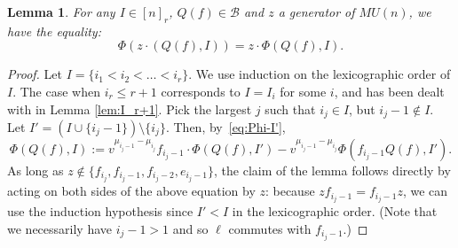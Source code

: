 \documentclass{amsart}
\numberwithin{equation}{section}
\theoremstyle{theorem}
\newtheorem{lemma}[theorem]{Lemma}
\theoremstyle{definition}
\newcommand{\sm}{\setminus}
\newcommand{\bb}{\mathcal{B}}
\newcommand{\drcomm}[1]{\textcolor{red}{#1}}
\begin{document}
\begin{lemma} \label{lem:general}
For any $I\in [n]_r$, $Q(f)\in \bb$ and $z$ a generator of $MU(n)$, we have the equality:
\[\Phi(z\cdot (Q(f),I)) = z\cdot \Phi(Q(f), I).\]
\end{lemma}

\begin{proof}
Let $I=\{i_1<i_2<\dots<i_r\}$. We use induction on the lexicographic order of $I$. The case when $i_r\leq r+1$ corresponds to $I=I_i$ for some $i$, and has been dealt with in %
Lemma \ref{lem:I_r+1}. Pick the largest $j$ such that $i_j\in I$, but $i_j-1\not\in I$. Let $I'=(I\cup\{i_j-1\})\sm\{i_j\}$. Then, by~\eqref{eq:Phi-I'},
\[\Phi(Q(f),I):=v^{\mu_{i_j-1}-\mu_{i_j}}f_{i_j-1}\cdot \Phi(Q(f),I')-v^{\mu_{i_j-1}-\mu_{i_j}}\Phi(f_{i_j-1}Q(f),I').\]
 As long as $z\not \in\{f_{i_j}, f_{i_j-1}, f_{i_j-2}, e_{i_j-1}\}$, the claim of the lemma follows directly by acting on both sides of the above equation by $z$: because $z f_{i_j-1}=f_{i_j-1}z$, we can use the induction hypothesis since $I'<I$ in the lexicographic order. (Note that we necessarily have $i_j-1>1$ and so $\ell$ commutes with $f_{i_j-1}$.)

 

\end{proof}
\end{document}
